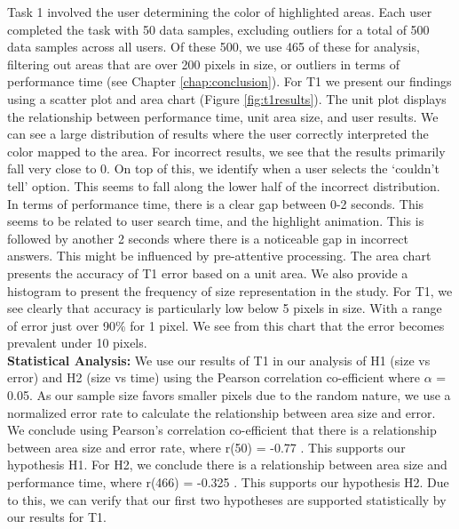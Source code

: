 Task 1 involved the user determining the color of highlighted areas. Each user completed the task with 50 data samples, excluding outliers for a total of 500 data samples across all users. Of these 500, we use 465 of these for analysis, filtering out areas that are over 200 pixels in size, or outliers in terms of performance time (see Chapter \ref{chap:conclusion}). For T1 we present our findings using a scatter plot and area chart (Figure \ref{fig:t1results}). The unit plot displays the relationship between performance time, unit area size, and user results. We can see a large distribution of results where the user correctly interpreted the color mapped to the area. For incorrect results, we see that the results primarily fall very close to 0. On top of this, we identify when a user selects the `couldn't tell' option. This seems to fall along the lower half of the incorrect distribution. In terms of performance time, there is a clear gap between 0-2 seconds. This seems to be related to user search time, and the highlight animation. This is followed by another 2 seconds where there is a noticeable gap in incorrect answers. This might be influenced by pre-attentive processing. The area chart presents the accuracy of T1 error based on a unit area. We also provide a histogram to present the frequency of size representation in the study. For T1, we see clearly that accuracy is particularly low below 5 pixels in size. With a range of error just over 90\% for 1 pixel. We see from this chart that the error becomes prevalent under 10 pixels. \\
\textbf{Statistical Analysis: } We use our results of T1 in our analysis of H1 (size vs error) and H2 (size vs time) using the Pearson correlation co-efficient where $\alpha$ = 0.05. As our sample size favors smaller pixels due to the random nature, we use a normalized error rate to calculate the relationship between area size and error.  We conclude using Pearson's correlation co-efficient that there is a relationship between area size and error rate, where r(50) = -0.77%
. This supports our hypothesis H1. For H2, we conclude there is a relationship between area size and performance time, where r(466) = -0.325%
. This supports our hypothesis H2. Due to this, we can verify that our first two hypotheses are supported statistically by our results for T1. 

